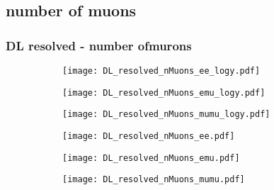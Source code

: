 \documentclass[aspectratio=169,8pt]{beamer}
\begin{document}
\subsection{number of muons}
\begin{frame}
\frametitle{DL resolved - number ofmurons}
\begin{figure}
\captionsetup[subfigure]{labelformat=empty}
\begin{subfigure}{0.32\textwidth}
\texttt{[image: DL\_resolved\_nMuons\_ee\_logy.pdf]}
\vspace*{-0.15cm}
\end{subfigure}
\hfil
\begin{subfigure}{0.32\textwidth}
\texttt{[image: DL\_resolved\_nMuons\_emu\_logy.pdf]}
\vspace*{-0.15cm}
\end{subfigure}
\hfil
\begin{subfigure}{0.32\textwidth}
\texttt{[image: DL\_resolved\_nMuons\_mumu\_logy.pdf]}
\vspace*{-0.15cm}
\end{subfigure}
\hfil
\begin{subfigure}{0.32\textwidth}
\texttt{[image: DL\_resolved\_nMuons\_ee.pdf]}
\vspace*{-0.15cm}
\end{subfigure}
\hfil
\begin{subfigure}{0.32\textwidth}
\texttt{[image: DL\_resolved\_nMuons\_emu.pdf]}
\vspace*{-0.15cm}
\end{subfigure}
\hfil
\begin{subfigure}{0.32\textwidth}
\texttt{[image: DL\_resolved\_nMuons\_mumu.pdf]}
\vspace*{-0.15cm}
\end{subfigure}
\hfil
\end{figure}
\end{frame}
\newpage
\end{document}

